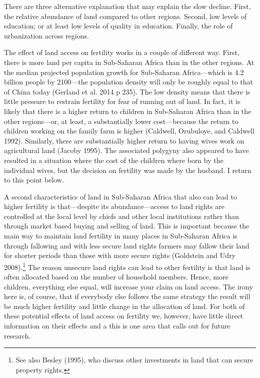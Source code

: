 \documentclass[]{article}
\begin{document}
There are three alternative explanation that may explain the slow decline. First, the relative abundance of land compared to other regions. Second, low levels of education; or at least low levels of quality in education. Finally, the role of urbanization across regions.

The effect of land access on fertility works in a couple of different way. First, there is more land per capita in Sub-Saharan Africa than in the other regions. At the median projected population growth for Sub-Saharan Africa---which is 4.2 billion people by 2100---the population density will only be roughly equal to that of China today (Gerland et al. 2014 p 235). The low density means that there is little pressure to restrain fertility for fear of running out of land. In fact, it is likely that there is a higher return to children in Sub-Saharan Africa than in the other regions---or, at least, a substantially lower cost---because the return to children working on the family farm is higher (Caldwell, Orubuloye, and Caldwell 1992). Similarly, there are substantially higher return to having wives work on agricultural land (Jacoby 1995). The associated polygyny also appeared to have resulted in a situation where the cost of the children where born by the individual wives, but the decision on fertility was made by the husband. I return to this point below.

A second characteristics of land in Sub-Saharan Africa that also can lead to higher fertility is that---despite its abundance---access to land rights are controlled at the local level by chiefs and other local institutions rather than through market based buying and selling of land. This is important because the main way to maintain land fertility in many places in Sub-Saharan Africa is through fallowing and with less secure land rights farmers may fallow their land for shorter periods than those with more secure rights (Goldstein and Udry 2008).\footnote{See also Besley (1995), who discuss other investments in land that can secure property rights.} The reason unsecure land rights can lead to other fertility is that land is often allocated based on the number of household members. Hence, more children, everything else equal, will increase your claim on land access. The irony here is, of course, that if everybody else follows the same strategy the result will be much higher fertility and little change in the allocation of land. For both of these potential effects of land access on fertility we, however, have little direct information on their effects and a this is one area that calls out for future research.
\end{document}
